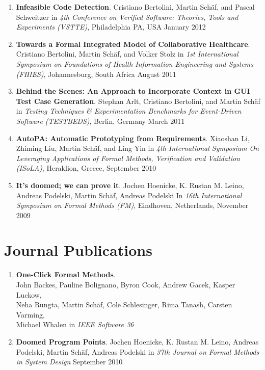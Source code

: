\begin{enumerate}
\item \textbf{Infeasible Code Detection}. Cristiano Bertolini, Martin
Sch\"af, and Pascal Schweitzer in \emph{4th Conference on Verified Software:
Theories, Tools and Experiments (VSTTE)}, Philadelphia PA, USA January 2012

\item \textbf{Towards a Formal Integrated Model of Collaborative Healthcare}.
Cristiano Bertolini, Martin Sch\"af, and Volker Stolz  in \emph{1st International Symposium on 
Foundations of Health Information Engineering and Systems (FHIES)}, Johannesburg, South Africa
August 2011

\item \textbf{Behind the Scenes: An Approach to Incorporate Context in GUI Test
Case Generation}. Stephan Arlt, Cristiano Bertolini, and Martin Sch\"af  in \emph{Testing Techniques \& Experimentation Benchmarks
for Event-Driven Software (TESTBEDS)}, Berlin, Germany
March 2011

\item \textbf{AutoPA: Automatic Prototyping from Requirements}. Xiaoshan Li,
Zhiming Liu, Martin Sch\"af, and Ling Yin in \emph{4th International Symposium On Leveraging Applications of Formal Methods, Verification and Validation (ISoLA)}, Heraklion, Greece,
September 2010

\item \textbf{It's doomed; we can prove it}. Jochen Hoenicke, K. Rustan M.
Leino, Andreas Podelski, Martin Sch\"af, Andreas Podelski In
\emph{16th International Symposium on Formal Methods (FM)}, Eindhoven, Netherlands,
November 2009
  
\setcounter{saveenum}{\value{enumi}}
\end{enumerate}



\section{\sc Journal Publications}

\begin{enumerate} \setcounter{enumi}{\value{saveenum}}

\item \textbf{One-Click Formal Methods}.
\\ John Backes, Pauline Bolignano, Byron Cook, Andrew Gacek, Kasper Luckow, \\
Neha Rungta, Martin Sch\"af, Cole Schlesinger, Rima Tanash, Carsten Varming, \\
Michael Whalen in 
\emph{IEEE Software 36}

\item  \textbf{Doomed Program Points}. Jochen Hoenicke, K. Rustan M. Leino,
Andreas Podelski, Martin Sch\"af, Andreas Podelski in
\emph{37th Journal on Formal Methods in System Design}
September 2010

\setcounter{saveenum}{\value{enumi}}
\end{enumerate}


